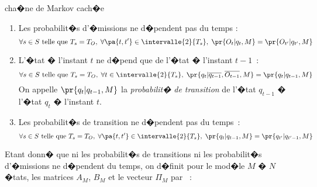 \begin{xdefinition} {cha�ne de Markov cach�e}
\begin{enumerate}
                    $$
                    \forall s \in S \text{ telle que } T_s = T_O, \; \forall t \in \intervalle{1}{T_O}, \;
                    \pr{O_t|\overline{q_t},\overline{O_{t-1}},M} = \pr{O_t|q_t,M}
                    $$
                    On appelle $\pr{O_t|q_t,M}$ la \emph{probabilit� d'�mission} de l'observation $O_t$ 
                                sachant l'�tat $q_t$ � l'instant $t$.
                \item Les probabilit�s d'�missions ne d�pendent pas du temps :
                    $$
                    \forall s \in S \text{ telle que } T_s = T_O, \; 
                            \forall \pa{t,t'} \in \intervalle{2}{T_s}, \; \pr{O_t|q_t,M} = \pr{O_{t'}|q_{t'},M}
                    $$
                \item L'�tat � l'instant $t$ ne d�pend que de l'�tat � l'instant $t-1$~:
                    $$
                    \forall s \in S \text{ telle que } T_s = T_O, \; \forall t \in \intervalle{2}{T_s}, \;
                    \pr{q_t| \overline{q_{t-1}},\overline{O_{t-1}},M} = \pr{q_t|q_{t-1},M}
                    $$
                    On appelle $\pr{q_t|q_{t-1},M}$ la \emph{probabilit� de transition} de l'�tat $q_{t-1}$ � l'�tat $q_t$ � l'instant $t$.
                \item Les probabilit�s de transition ne d�pendent pas du temps~:
                    $$
                    \forall s \in S \text{ telle que } T_s = T_O, \; \forall \pa{t,t'} 
                            \in \intervalle{2}{T_s}, \; \pr{q_t|q_{t-1},M} = \pr{q_{t'}|q_{t'-1},M}
                    $$
                \end{enumerate}
        \end{xdefinition}



Etant donn� que ni les probabilit�s de transitions ni les probabilit�s d'�missions ne d�pendent du temps, on d�finit pour le mod�le $M$ � $N$ �tats, les matrices $A_M$, $B_M$ et le vecteur $\Pi_M$ par ~:


